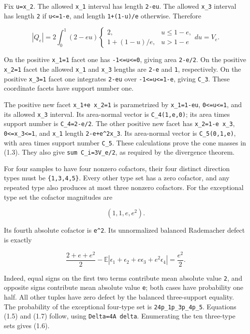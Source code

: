 \documentclass[
  11pt,
]{article}
\begin{document}
Fix \texttt{u=x\_2}. The allowed \texttt{x\_1} interval has length
\texttt{2-e\textbar{}u\textbar{}}. The allowed \texttt{x\_3} interval
has length \texttt{2} if \texttt{\textbar{}u\textbar{}\textless{}=1-e},
and length \texttt{1+(1-\textbar{}u\textbar{})/e} otherwise. Therefore

\[
 |Q_e|=2\int_0^1(2-eu)
     \begin{cases}2,&u\le1-e,\\1+(1-u)/e,&u>1-e\end{cases}
          du=V_e.
\]

On the positive \texttt{x\_1=1} facet one has
\texttt{-1\textless{}=u\textless{}=0}, giving area \texttt{2-e/2}. On
the positive \texttt{x\_2=1} facet the allowed \texttt{x\_1} and
\texttt{x\_3} lengths are \texttt{2-e} and \texttt{1}, respectively. On
the positive \texttt{x\_3=1} facet one integrates
\texttt{2-e\textbar{}u\textbar{}} over
\texttt{-1\textless{}=u\textless{}=1-e}, giving \texttt{C\_3}. These
coordinate facets have support number one.

The positive new facet \texttt{x\_1+e\ x\_2=1} is parametrized by
\texttt{x\_1=1-eu}, \texttt{0\textless{}=u\textless{}=1}, and its
allowed \texttt{x\_3} interval. Its area-normal vector is
\texttt{C\_4(1,e,0)}; its area times support number is
\texttt{C\_4=2-e/2}. The other positive new facet has
\texttt{x\_2=1-e\ x\_3}, \texttt{0\textless{}=x\_3\textless{}=1}, and
\texttt{x\_1} length \texttt{2-e+e\^{}2x\_3}. Its area-normal vector is
\texttt{C\_5(0,1,e)}, with area times support number \texttt{C\_5}.
These calculations prove the cone masses in (1.3). They also give
\texttt{sum\ C\_i=3V\_e/2}, as required by the divergence theorem.

For four samples to have four nonzero cofactors, their four distinct
direction types must be \texttt{\{1,3,4,5\}}. Every other type set has a
zero cofactor, and any repeated type also produces at most three nonzero
cofactors. For the exceptional type set the cofactor magnitudes are

\[
 (1,1,e,e^2).
\]

Its fourth absolute cofactor is \texttt{e\^{}2}. Its unnormalized
balanced Rademacher defect is exactly

\[
 \frac{2+e+e^2}{2}
 -\mathbb E|\epsilon_1+\epsilon_2+e\epsilon_3+e^2\epsilon_4|
 =\frac{e^2}{2}.
\]

Indeed, equal signs on the first two terms contribute mean absolute
value \texttt{2}, and opposite signs contribute mean absolute value
\texttt{e}; both cases have probability one half. All other tuples have
zero defect by the balanced three-support equality. The probability of
the exceptional four-type set is \texttt{24p\_1p\_3p\_4p\_5}. Equations
(1.5) and (1.7) follow, using \texttt{Delta=4A\ delta}. Enumerating the
ten three-type sets gives (1.6).
\end{document}
